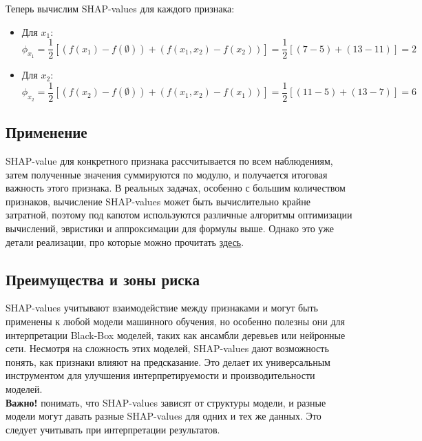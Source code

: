Теперь вычислим SHAP-values для каждого признака:
\begin{itemize}
    \item Для $x_1$:
          $$
              \phi_{x_1} = \frac{1}{2} \left[ (f(x_1) - f(\emptyset)) + (f(x_1, x_2) - f(x_2)) \right] = \frac{1}{2} \left[ (7 - 5) + (13 - 11) \right] = 2
          $$
    \item Для $x_2$:
          $$
              \phi_{x_2} = \frac{1}{2} \left[ (f(x_2) - f(\emptyset)) + (f(x_1, x_2) - f(x_1)) \right] = \frac{1}{2} \left[ (11 - 5) + (13 - 7) \right] = 6
          $$
\end{itemize}

\subsection*{Применение}
SHAP-value для конкретного признака рассчитывается по всем наблюдениям, затем полученные значения суммируются по модулю, и получается итоговая важность этого признака.
В реальных задачах, особенно с большим количеством признаков, вычисление SHAP-values может быть вычислительно крайне затратной, поэтому под капотом используются различные алгоритмы оптимизации вычислений, эвристики и аппроксимации для формулы выше. Однако это уже детали реализации, про которые можно прочитать \href{https://github.com/shap/shap}{здесь}.

\subsection*{Преимущества и зоны риска}
SHAP-values учитывают взаимодействие между признаками и могут быть применены к любой модели машинного обучения, но особенно полезны они для интерпретации Black-Box моделей, таких как ансамбли деревьев или нейронные сети. Несмотря на сложность этих моделей, SHAP-values дают возможность понять, как признаки влияют на предсказание. Это делает их универсальным инструментом для улучшения интерпретируемости и производительности моделей.\\
\textbf{Важно!} понимать, что SHAP-values зависят от структуры модели, и разные модели могут давать разные SHAP-values для одних и тех же данных. Это следует учитывать при интерпретации результатов.


